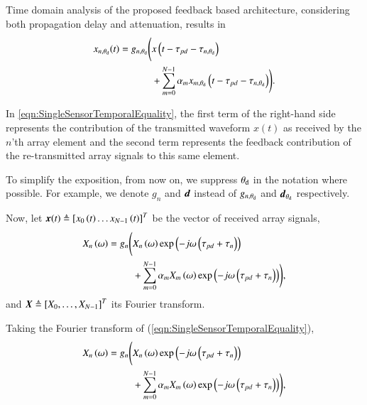 Time domain analysis of the proposed feedback based architecture, considering both propagation delay and attenuation, results in 
\begin{equation}
    \label{eqn:SingleSensorTemporalEquality}
        \begin{split}
            x_{n,\thetaD}(t) = g_{n,\thetaD}\Bigg{(}&x\rBrace{t-\tau_{pd}-\tau_{n,\thetaD}}\\
            &+\sum_{m=0}^{N-1}{\alpha_{m}x_{m,\thetaD}\rBrace{t-\tau_{pd}-\tau_{n,\thetaD}}}\Bigg{)}.
        \end{split}
\end{equation}
\par In \eqref{eqn:SingleSensorTemporalEquality}, the first term of the right-hand side represents the contribution of the transmitted waveform $x(t)$ as received by the $n$'th array element and the second term represents the feedback contribution of the re-transmitted array signals to this same element.
\par To simplify the exposition, from now on, we suppress $\theta_{\text{d}}$ in the notation where possible. For example, we denote $g_n$ and $\boldsymbol{d}$ instead of $g_{n,\theta_{\text{d}}}$ and $\boldsymbol{d}_{\theta_{\text{d}}}$ respectively. 
\par Now, let $\boldsymbol{x}{\left({t}\right)}\triangleq\left[{x_{0}\left({t}\right)\hdots{}x_{N-1}\left({t}\right)}\right]^{T}$ be the vector of received array signals, 
\begin{equation}
    \label{eqn_singleSensorFourier}
        \begin{split}
            \F{x}_{n}\rBrace{\omega} =
            g_n\Bigg( & \F{x}_{n}\rBrace{\omega}
            \exp\rBrace{-j\omega\rBrace{\tau_{pd}+\tau_{n}}}
            \\&+\sum_{m=0}^{N-1}
            {
            \alpha_{m}\F{x}_{m}\rBrace{\omega}
            \exp\rBrace{-j\omega\rBrace{\tau_{pd}+\tau_{n}}}
            }\Bigg), 
        \end{split}
\end{equation}
and  $\vecnot{\F{x}}\triangleq\vBrace{\F{x}_{0},\hdots,\F{x}_{N-1}}^{T}$ its Fourier transform. 
\par Taking the Fourier transform of (\ref{eqn:SingleSensorTemporalEquality}),
\begin{equation}
    \label{eqn_singleSensorFourier}
        \begin{split}
            \F{x}_{n}\rBrace{\omega} =
            g_n\Bigg( & \F{x}_{n}\rBrace{\omega}
            \exp\rBrace{-j\omega\rBrace{\tau_{pd}+\tau_{n}}}
            \\&+\sum_{m=0}^{N-1}
            {
            \alpha_{m}\F{x}_{m}\rBrace{\omega}
            \exp\rBrace{-j\omega\rBrace{\tau_{pd}+\tau_{n}}}
            }\Bigg),
        \end{split}
\end{equation}
